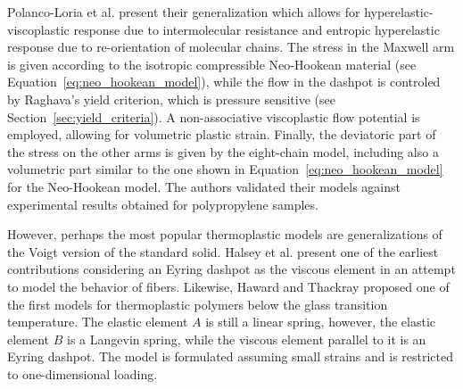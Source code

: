 Polanco-Loria et al. \citep{polanco-loriaConstitutiveModelThermoplastics2010} present their generalization which allows for hyperelastic-viscoplastic response due to intermolecular resistance and entropic hyperelastic response due to re-orientation of molecular chains.
The stress in the Maxwell arm is given according to the isotropic compressible Neo-Hookean material (see Equation~\eqref{eq:neo_hookean_model}), while the flow in the dashpot is controled by Raghava's yield criterion, which is pressure sensitive (see Section~\ref{sec:yield_criteria}).
A non-associative viscoplastic flow potential is employed, allowing for volumetric plastic strain.
Finally, the deviatoric part of the stress on the other arms is given by the eight-chain model, including also a volumetric part similar to the one shown in Equation~\eqref{eq:neo_hookean_model} for the Neo-Hookean model.
The authors validated their models against experimental results obtained for polypropylene samples.

However, perhaps the most popular thermoplastic models are generalizations of the Voigt version of the standard solid.
Halsey et al. \citep{halseyMechanicalPropertiesTextiles1945} present one of the earliest contributions considering an Eyring dashpot as the viscous element in an attempt to model the behavior of fibers.
Likewise, Haward and Thackray \citep{hawardUseMathematicalModel1968} proposed one of the first models for thermoplastic polymers below the glass transition temperature.
The elastic element $A$ is still a linear spring, however, the elastic element $B$ is a Langevin spring, while the viscous element parallel to it is an Eyring dashpot.
The model is formulated assuming small strains and is restricted to one-dimensional loading.


